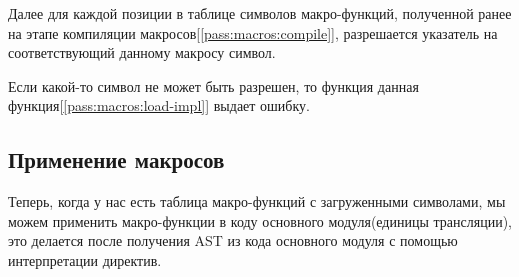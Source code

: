 Далее для каждой позиции в таблице символов макро-функций, полученной ранее на этапе компиляции макросов[\ref{pass:macros:compile}], 
разрешается указатель на соответствующий данному макросу символ.

Если какой-то символ не может быть разрешен, то функция данная функция[\ref{pass:macros:load-impl}] выдает ошибку.

\subsection{Применение макросов}
\label{pass:macros:apply}

Теперь, когда у нас есть таблица макро-функций с загруженными символами, мы можем применить макро-функции в коду основного модуля(единицы трансляции),
это делается после получения AST из кода основного модуля с помощью интерпретации директив.

